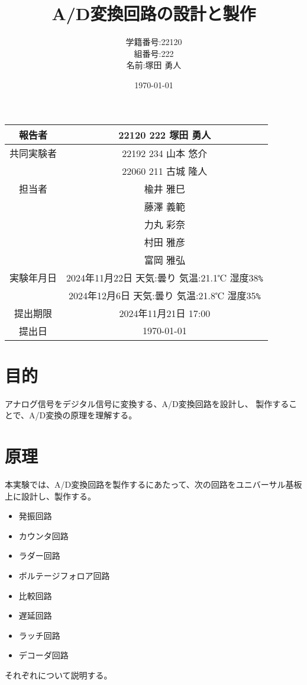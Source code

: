 \documentclass[a4paper,11pt,dvipdfmx]{jsarticle}
\begin{document}
\begin{table}[b]
  \centering
  \begin{tabular}{|c|c|}
    \hline
    報告者     & 22120 222 塚田 勇人 \\
    \hline
    共同実験者 & 22192 234 山本 悠介  \\ & 22060 211 古城 隆人\\
    \hline
    担当者     & 楡井 雅巳 \\
              &  藤澤 義範\\
    &力丸 彩奈\\
    &村田 雅彦\\
    &富岡 雅弘\\
    \hline
    実験年月日 & 2024年11月22日 天気:曇り 気温:21.1℃ 湿度38\verb#%#\\
    & 2024年12月6日 天気:曇り 気温:21.8℃ 湿度35\verb#%#\\
    \hline
    提出期限   & 2024年11月21日 17:00  \\
    \hline
    提出日     & \today              \\
    \hline
  \end{tabular}
\end{table}

\title{A/D変換回路の設計と製作}
\author{学籍番号:22120 \\ 組番号:222 \\名前:塚田 勇人}
\date{\today}
\maketitle

\newpage

\section{目的}
アナログ信号をデジタル信号に変換する、A/D変換回路を設計し、
製作することで、A/D変換の原理を理解する。

\section{原理}
本実験では、A/D変換回路を製作するにあたって、次の回路をユニバーサル基板
上に設計し、製作する。
\begin{itemize}
  \item 発振回路
  \item カウンタ回路
  \item ラダー回路
  \item ボルテージフォロア回路
  \item 比較回路
  \item 遅延回路
  \item ラッチ回路
  \item デコーダ回路
\end{itemize}
それぞれについて説明する。
\end{document}
